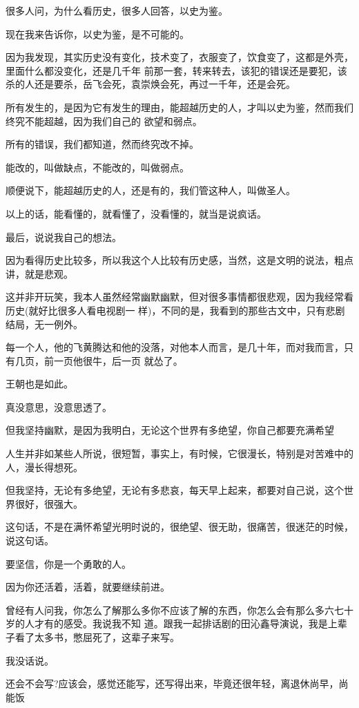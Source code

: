 \documentclass[11pt,a4paper,onecolumn]{article}
\begin{document}
很多人问，为什么看历史，很多人回答，以史为鉴。

现在我来告诉你，以史为鉴，是不可能的。

因为我发现，其实历史没有变化，技术变了，衣服变了，饮食变了，这都是外壳，里面什么都没变化，还是几千年
前那一套，转来转去，该犯的错误还是要犯，该杀的人还是要杀，岳飞会死，袁崇焕会死，再过一千年，还是会死。

所有发生的，是因为它有发生的理由，能超越历史的人，才叫以史为鉴，然而我们终究不能超越，因为我们自己的
欲望和弱点。

所有的错误，我们都知道，然而终究改不掉。

能改的，叫做缺点，不能改的，叫做弱点。

顺便说下，能超越历史的人，还是有的，我们管这种人，叫做圣人。

以上的话，能看懂的，就看懂了，没看懂的，就当是说疯话。

最后，说说我自己的想法。

因为看得历史比较多，所以我这个人比较有历史感，当然，这是文明的说法，粗点讲，就是悲观。

这并非开玩笑，我本人虽然经常幽默幽默，但对很多事情都很悲观，因为我经常看历史(就好比很多人看电视剧一
样)，不同的是，我看到的那些古文中，只有悲剧结局，无一例外。

每一个人，他的飞黄腾达和他的没落，对他本人而言，是几十年，而对我而言，只有几页，前一页他很牛，后一页
就怂了。

王朝也是如此。

真没意思，没意思透了。

但我坚持幽默，是因为我明白，无论这个世界有多绝望，你自己都要充满希望

人生并非如某些人所说，很短暂，事实上，有时候，它很漫长，特别是对苦难中的人，漫长得想死。

但我坚持，无论有多绝望，无论有多悲哀，每天早上起来，都要对自己说，这个世界很好，很强大。

这句话，不是在满怀希望光明时说的，很绝望、很无助，很痛苦，很迷茫的时候，说这句话。

要坚信，你是一个勇敢的人。

因为你还活着，活着，就要继续前进。

曾经有人问我，你怎么了解那么多你不应该了解的东西，你怎么会有那么多六七十岁的人才有的感受。我说我不知
道。跟我一起排话剧的田沁鑫导演说，我是上辈子看了太多书，憋屈死了，这辈子来写。

我没话说。

还会不会写?应该会，感觉还能写，还写得出来，毕竟还很年轻，离退休尚早，尚能饭
\end{document}
